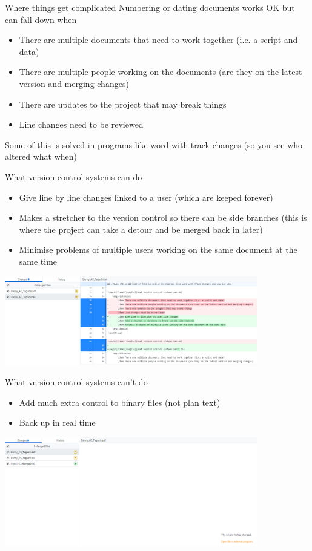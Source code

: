 \documentclass[10pt]{beamer}
\begin{document}
\begin{frame}[fragile]{Where things get complicated}
Numbering or dating documents works OK but can fall down when\\
\begin{itemize}
\item There are multiple documents that need to work together (i.e. a script and data)
\item There are multiple people working on the documents (are they on the latest version and merging changes)
\item There are updates to the project that may break things
\item Line changes need to be reviewed
\end{itemize}

Some of this is solved in programs like word with track changes (so you see who altered what when)
\end{frame}


\begin{frame}[fragile]{What version control systems can do}
\begin{itemize}
\item Give line by line changes linked to a user (which are keeped forever)
\item Makes a stretcher to the version control so there can be side branches (this is where the project can take a detour and be merged back in later)
\item Minimise problems of multiple users working on the same document at the same time
\end{itemize}
\includegraphics[width=11cm]{Figs/GHD/change}
\end{frame}


\begin{frame}[fragile]{What version control systems can't do}
\begin{itemize}
\item Add much extra control to binary files (not plan text)
\item Back up in real time
\end{itemize}
\includegraphics[width=11cm]{Figs/GHD/binarychange}
\end{frame}
\end{document}
